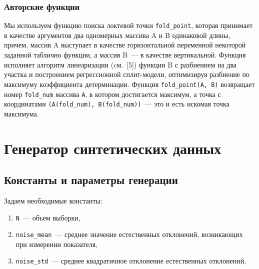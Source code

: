 \documentclass[a4paper,12pt]{article}
\begin{document}
%

\subsubsection{Авторские функции}

Мы используем функцию поиска локтевой точки \texttt{fold\_point}, которая принимает в качестве аргументов два одномерных массива A и B одинаковой длины, причем, массив A выступает в качестве горизонтальной переменной некоторой заданной таблично функции, а массив B — в качестве вертикальной. Функция исполняет алгоритм линеаризации (cм. [5]) функции B с разбиением на два участка и построением регрессионной сплит-модели, оптимизируя разбиение по максимуму коэффициента детерминации. Функция \texttt{fold\_point(A, B)} возвращает номер \texttt{fold\_num} массива \texttt{A}, в котором достигается максимум, а точка с координатами \texttt{(A(fold\_num), B(fold\_num))} — это и есть искомая точка максимума.


\section{Генератор синтетических данных}


\subsection{Константы и параметры генерации}


Задаем необходимые константы: 

\medskip\noindent
\begin{enumerate}
	\item \texttt{N} — объем выборки,
	\item \texttt{noise\_mean} — среднее значение естественных отклонений, возникающих при измерении показателя, 
	\item \texttt{noise\_std} — среднее квадратичное отклонение естественных отклонений,
\end{enumerate}
\end{document}
